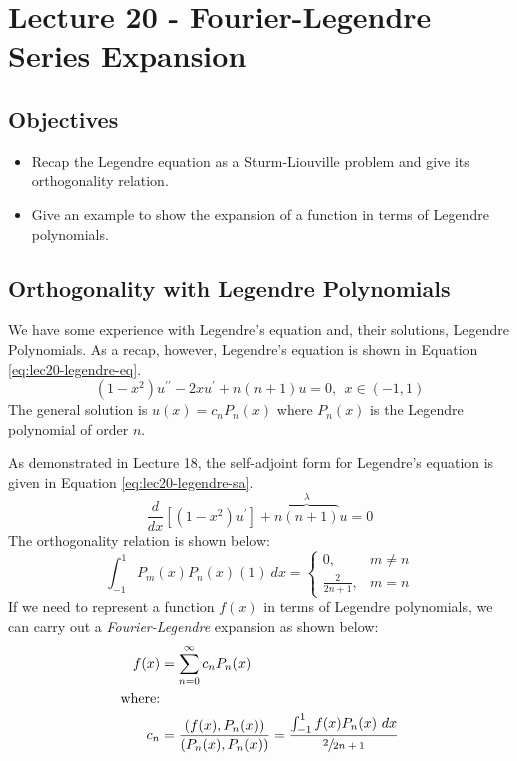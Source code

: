 \chapter{Lecture 20 - Fourier-Legendre Series Expansion}
\label{ch:lec20}
\section{Objectives}
\begin{itemize}
\item Recap the Legendre equation as a Sturm-Liouville problem and give its orthogonality relation.
\item Give an example to show the expansion of a function in terms of Legendre polynomials.
\end{itemize}
\setcounter{lstannotation}{0} %
\section{Orthogonality with Legendre Polynomials}
We have some experience with Legendre's equation and, their solutions, Legendre Polynomials.  As a recap, however, Legendre's equation is shown in Equation \ref{eq:lec20-legendre-eq}.
\begin{equation}
\left(1-x^2\right)u^{\prime \prime} - 2xu^{\prime} + n(n+1)u = 0, \ \ x \in (-1,1)
\label{eq:lec20-legendre-eq}
\end{equation}
The general solution is $u(x) = c_nP_n(x)$ where $P_n(x)$ is the Legendre polynomial of order $n$.  

As demonstrated in Lecture 18, the self-adjoint form for Legendre's equation is given in Equation \ref{eq:lec20-legendre-sa}.
\begin{equation}
\frac{d}{dx}\left[\left(1-x^2 \right) u^{\prime} \right] + \overbrace{n(n+1)}^{\lambda}u = 0
\label{eq:lec20-legendre-sa}
\end{equation}
The orthogonality relation is shown below:
\begin{equation*}
\int_{-1}^{1} P_m(x)P_n(x) (1) \ dx = 
\begin{cases}
0, & m\ne n \\
\frac{2}{2n+1}, & m=n
\end{cases}
\end{equation*}
If we need to represent a function $f(x)$ in terms of Legendre polynomials, we can carry out a \emph{Fourier-Legendre} expansion as shown below:
\begin{align}
f(x) &= \sum\limits_{n=0}^{\infty}c_n P_n(x) \label{eq:lec20-FL-exp}\\ 
\text{where:}& \nonumber \\
c_n &= \frac{\left(f(x),P_n(x) \right)}{\left(P_n(x),P_n(x) \right)} = \frac{\int_{-1}^{1} f(x) P_n(x) \ dx}{\sfrac{2}{2n+1}} 
\label{eq:lec20-FL-coeff}
\end{align}

